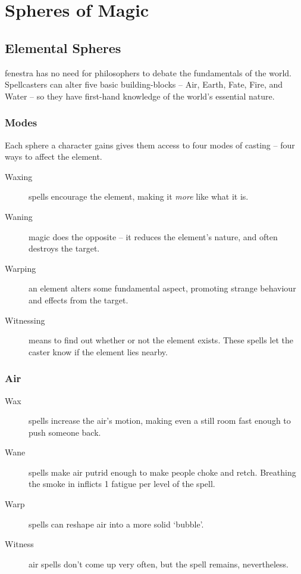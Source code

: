 \section{Spheres of Magic}

\begin{multicols}{2}

\subsection{Elemental Spheres}

\Gls{fenestra} has no need for philosophers to debate the fundamentals of the world.
Spellcasters can alter five basic building-blocks -- Air, Earth, Fate, Fire, and Water -- so they have first-hand knowledge of the world's essential nature.

\subsubsection{Modes}
Each sphere a character gains gives them access to four modes of casting -- four ways to affect the element.

\begin{description}
  \item[Waxing]
  spells encourage the element, making it \emph{more} like what it is.
  \item[Waning]
  magic does the opposite -- it reduces the element's nature, and often destroys the target.
  \item[Warping]
  an element alters some fundamental aspect, promoting strange behaviour and effects from the target.
  \item[Witnessing]
  means to find out whether or not the element exists.
  These spells let the caster know if the element lies nearby.
\end{description}

\subsubsection{Air}

\begin{description}
  \item[Wax]
  spells increase the air's motion, making even a still room fast enough to push someone back.
  \item[Wane]
  spells make air putrid enough to make people choke and retch.
  Breathing the smoke in inflicts 1 \gls{fatigue} per level of the spell.
  \item[Warp]
  spells can reshape air into a more solid `bubble'.
  \item[Witness]
  air spells don't come up very often, but the spell remains, nevertheless.
\end{description}


\end{multicols}
